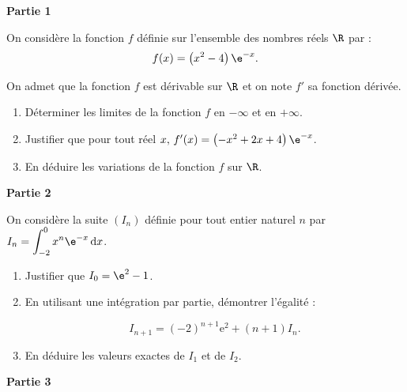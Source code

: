 \medskip

\textbf{Partie 1}

\medskip

On considère la fonction $f$ définie sur l'ensemble des nombres réels $\R$ par :
\[f(x) = \left(x^2 - 4\right)\e^{-x}.\]

On admet que la fonction $f$ est dérivable sur $\R$ et on note $f'$ sa fonction dérivée.

\medskip

\begin{enumerate}
\item Déterminer les limites de la fonction $f$ en $-\infty$ et en $+\infty$.
\item Justifier que pour tout réel $x,\, f'(x) = \left(-x^2 + 2x + 4\right)\e^{-x}$.
\item En déduire les variations de la fonction $f$ sur $\R$.
\end{enumerate}

\bigskip

\textbf{Partie 2}

\medskip

On considère la suite $(I_n)$ définie pour tout entier naturel $n$ par $I_n = \displaystyle\int_{-2}^0 x^n\e^{-x}\, \text{d}x$.

\medskip

\begin{enumerate}
\item Justifier que $I_0 = \e^2 - 1$.
\item En utilisant une intégration par partie, démontrer l'égalité :

\[I_{n+1} = (- 2)^{n+1} \text{e}^2 + (n + 1)I_n.\]

\item En déduire les valeurs exactes de $I_1$ et de $I_2$.
\end{enumerate}

\medskip

\textbf{Partie 3}

\medskip

